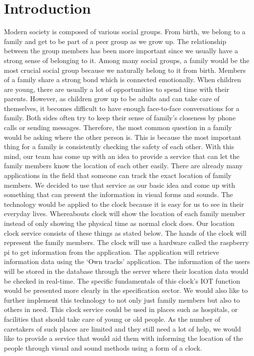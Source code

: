 \documentclass[10pt,a4paper,twocolumn]{report}
\begin{document}
\section{Introduction}
	Modern society is composed of various social groups. From birth, we belong to a family and get to be part of a peer group as we grow up. The relationship between the group members has been more important since we usually have a strong sense of belonging to it. Among many social groups, a family would be the most crucial social group because we naturally belong to it from birth. 
     Members of a family share a strong bond which is connected emotionally. When children are young, there are usually a lot of opportunities to spend time with their parents. However, as children grow up to be adults and can take care of themselves, it becomes difficult to have enough face-to-face conversations for a family. Both sides often try to keep their sense of family’s closeness by phone calls or sending messages. Therefore, the most common question in a family would be asking where the other person is. This is because the most important thing for a family is consistently checking the safety of each other. 
     With this mind, our team has come up with an idea to provide a service that can let the family members know the location of each other easily. There are already many applications in the field that someone can track the exact location of family members. We decided to use that service as our basic idea and come up with something that can present the information in visual forms and sounds. The technology would be applied to the clock because it is easy for us to see in their everyday lives. Whereabouts clock will show the location of each family member instead of only showing the physical time as normal clock does. 
     Our location clock service consists of these things as stated below. The hands of the clock will represent the family members. The clock will use a hardware called the raspberry pi to get information from the application. The application will retrieve information data using the ‘Own tracks’ application. The information of the users will be stored in the database through the server where their location data would be checked in real-time. The specific fundamentals of this clock’s IOT function would be presented more clearly in the specification sector. 
     We would also like to further implement this technology to not only just family members but also to others in need. This clock service could be used in places such as hospitals, or facilities that should take care of young or old people. As the number of caretakers of such places are limited and they still need a lot of help, we would like to provide a service that would aid them with informing the location of the people through visual and sound methods using a form of a clock.
     
\end{document}
